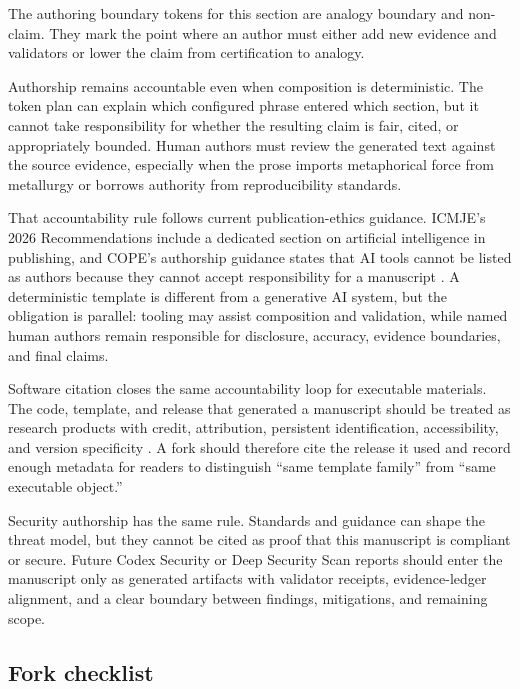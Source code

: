 \documentclass[
  english,
]{article}
\begin{document}
The authoring boundary tokens for this section are analogy boundary and
non-claim. They mark the point where an author must either add new
evidence and validators or lower the claim from certification to
analogy.

Authorship remains accountable even when composition is deterministic.
The token plan can explain which configured phrase entered which
section, but it cannot take responsibility for whether the resulting
claim is fair, cited, or appropriately bounded. Human authors must
review the generated text against the source evidence, especially when
the prose imports metaphorical force from metallurgy or borrows
authority from reproducibility standards.

That accountability rule follows current publication-ethics guidance.
ICMJE's 2026 Recommendations include a dedicated section on artificial
intelligence in publishing, and COPE's authorship guidance states that
AI tools cannot be listed as authors because they cannot accept
responsibility for a manuscript
\citep{icmje2026recommendations, cope2023ai}. A deterministic template
is different from a generative AI system, but the obligation is
parallel: tooling may assist composition and validation, while named
human authors remain responsible for disclosure, accuracy, evidence
boundaries, and final claims.

Software citation closes the same accountability loop for executable
materials. The code, template, and release that generated a manuscript
should be treated as research products with credit, attribution,
persistent identification, accessibility, and version specificity
\citep{smith2016softwarecitation}. A fork should therefore cite the
release it used and record enough metadata for readers to distinguish
``same template family'' from ``same executable object.''

Security authorship has the same rule. Standards and guidance can shape
the threat model, but they cannot be cited as proof that this manuscript
is compliant or secure. Future Codex Security or Deep Security Scan
reports should enter the manuscript only as generated artifacts with
validator receipts, evidence-ledger alignment, and a clear boundary
between findings, mitigations, and remaining scope.

\subsection{Fork checklist}\label{fork-checklist}
\end{document}
